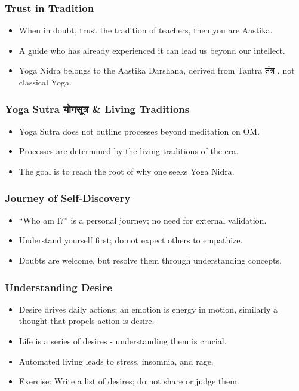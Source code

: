 \begin{frame}[fragile]\frametitle{Trust in Tradition}
      \begin{itemize}
        \item When in doubt, trust the tradition of teachers, then
you are Aastika.
        \item A guide who has already experienced it can lead us beyond our intellect.
        \item Yoga Nidra belongs to the Aastika Darshana, derived from Tantra तंत्र , not classical Yoga.
      \end{itemize}
\end{frame}

\begin{frame}[fragile]\frametitle{Yoga Sutra योगसूत्र  \& Living Traditions}
      \begin{itemize}
        \item Yoga Sutra does not outline processes beyond meditation on OM.
        \item Processes are determined by the living traditions of the era.
        \item The goal is to reach the root of why one seeks Yoga Nidra.
      \end{itemize}
\end{frame}

\begin{frame}[fragile]\frametitle{Journey of Self-Discovery}
      \begin{itemize}
        \item ``Who am I?'' is a personal journey; no need for external validation.
        \item Understand yourself first; do not expect others to empathize.
        \item Doubts are welcome, but resolve them through understanding concepts.
      \end{itemize}
\end{frame}

\begin{frame}[fragile]\frametitle{Understanding Desire}
      \begin{itemize}
        \item Desire drives daily actions;  an emotion is energy in motion, similarly a thought that propels action is desire.
        \item Life is a series of desires - understanding them is crucial.
        \item Automated living leads to stress, insomnia, and rage.
        \item Exercise: Write a list of desires; do not share or judge them.
      \end{itemize}
\end{frame}

